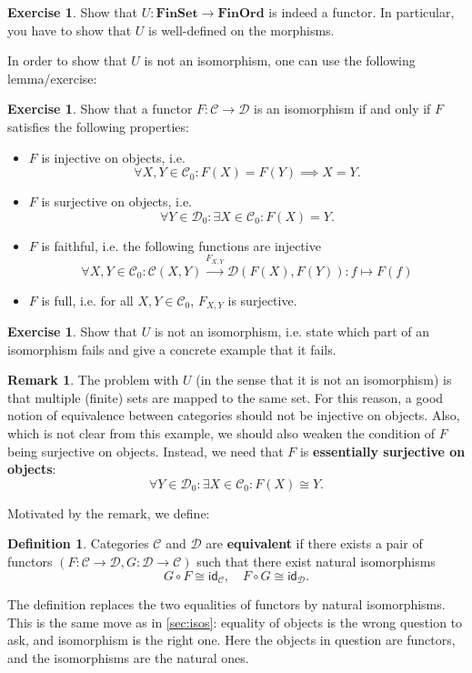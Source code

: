 \documentclass[a4paper,11pt, oneside,titlepage=false]{scrbook}
\theoremstyle{plain}
\theoremstyle{definition}
\newtheorem{rem}[thm]{Remark}
\newtheorem{dfn}[thm]{Definition}
\newtheorem{exer}[thm]{Exercise}
\newcommand{\cfont}[1]{\ensuremath{\mathsf{#1}}}
\newcommand{\Cat}[1]{\mathcal{#1}}
\newcommand{\CC}{\Cat{C}}
\newcommand{\DD}{\Cat{D}}
\newcommand{\Catb}[1]{\mathbf{#1}}
\newcommand{\FINSET}{\Catb{FinSet}}
\newcommand{\Ob}[1]{{#1}_0}
\newcommand{\CHom}[3]{{#1}(#2,#3)}
\newcommand{\Id}[1][]{\cfont{id}_{#1}}
\newcommand{\co}[2]{\ensuremath{#2 \circ #1}}
\begin{document}
\begin{exer} Show that $U: \FINSET\to \Catb{FinOrd}$ is indeed a functor. In particular, you have to show that $U$ is well-defined on the morphisms.
\end{exer}

In order to show that $U$ is not an isomorphism, one can use the following lemma/exercise:
\begin{exer} Show that a functor $F:\CC\to\DD$ is an isomorphism if and only if $F$ satisfies the following properties:
\begin{itemize}
\item $F$ is injective on objects, i.e.
\[
\forall X,Y\in\Ob{\CC}: F(X) = F(Y) \implies X=Y.
\]
\item $F$ is surjective on objects, i.e.
\[
\forall Y\in\Ob{\DD}: \exists X\in\Ob{\CC} : F(X) = Y.
\]
\item $F$ is faithful, i.e. the following functions are injective
\[
\forall X,Y\in\Ob{\CC}: \CHom{\CC}{X}{Y} \xrightarrow{F_{X,Y}} \CHom{\DD}{F(X)}{F(Y)} : f\mapsto F(f)
\]
\item $F$ is full, i.e. for all $X,Y\in \Ob{\CC}$, $F_{X,Y}$ is surjective.
\end{itemize}
\end{exer}

\begin{exer} Show that $U$ is not an isomorphism, i.e. state which part of an isomorphism fails and give a concrete example that it fails.
\end{exer}

\begin{rem} The problem with $U$ (in the sense that it is not an isomorphism) is that multiple (finite) sets are mapped to the same set. For this reason, a good notion of equivalence between categories should not be injective on objects. Also, which is not clear from this example, we should also weaken the condition of $F$ being surjective on objects. Instead, we need that $F$ is \textbf{essentially surjective on objects}:
\[
\forall Y\in\Ob{\DD}: \exists X\in\Ob{\CC} : F(X) \cong Y.
\]
\end{rem}
Motivated by the remark, we define:
\begin{dfn} Categories $\CC$ and $\DD$ are \textbf{equivalent} if there exists a pair of functors $(F:\CC\to\DD, G:\DD\to\CC)$ such that there exist natural isomorphisms
\[
\co{F}{G} \cong \Id[\CC], \quad \co{G}{F} \cong \Id[\DD].
\]
\end{dfn}

The definition replaces the two equalities of functors by natural isomorphisms.
This is the same move as in \cref{sec:isos}: equality of objects is the wrong
question to ask, and isomorphism is the right one.
Here the objects in question are functors, and the isomorphisms are the natural
ones.
\end{document}
